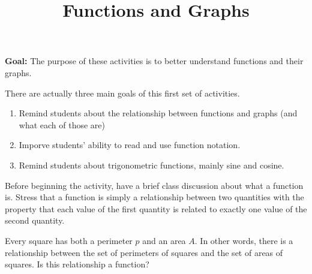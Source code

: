 \documentclass{ximera}
\title{Functions and Graphs}
\begin{document}
\maketitle

\noindent\textbf{Goal:} The purpose of these activities is to better understand functions and their graphs.
\begin{instnote}
There are actually three main goals of this first set of activities.

\begin{enumerate}
\item Remind students about the relationship between functions and graphs (and what each of those are)
\item Imporve students' ability to read and use function notation.
\item Remind students about trigonometric functions, mainly sine and cosine.
\end{enumerate}

Before beginning the activity, have a brief class discussion about what a function is.  Stress that a function is simply a relationship between two quantities with the property that each value of the first quantity is related to exactly one value of the second quantity.

\end{instnote}

\begin{problem} 
Every square has both a perimeter $p$ and an area $A$.  In other words, there is a relationship between the set of perimeters of squares and the set of areas of squares.  Is this relationship a function?
\end{problem}
\end{document}
